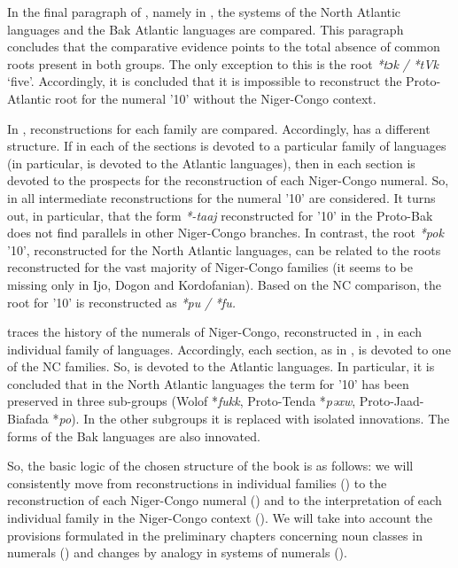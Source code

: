 In the final paragraph of , namely in , the systems of the North Atlantic languages and the Bak Atlantic languages are compared. This paragraph concludes that the comparative evidence points to the total absence of common roots present in both groups. The only exception to this is the root \textit{*tɔk} \textit{/} \textit{*tVk} ‘five'. Accordingly, it is concluded that it is impossible to reconstruct the Proto-Atlantic root for the numeral '10' without the Niger-Congo context.

In , reconstructions for each family are compared. Accordingly,  has a different structure. If in  each of the sections is devoted to a particular family of languages (in particular,  is devoted to the Atlantic languages), then in  each section is devoted to the prospects for the reconstruction of each Niger-Congo numeral. So, in  all intermediate reconstructions for the numeral '10' are considered. It turns out, in particular, that the form \textit{*-taaj} reconstructed for '10' in the Proto-Bak does not find parallels in other Niger-Congo branches. In contrast, the root \textit{*pok} '10', reconstructed for the North Atlantic languages, can be related to the roots reconstructed for the vast majority of Niger-Congo families (it seems to be missing only in Ijo, Dogon and Kordofanian). Based on the NC comparison, the root for '10' is reconstructed as \textit{*pu} \textit{/} \textit{*fu.}

 traces the history of the numerals of Niger-Congo, reconstructed in , in each individual family of languages. Accordingly, each section, as in , is devoted to one of the NC families. So,  is devoted to the Atlantic languages. In particular, it is concluded that in the North Atlantic languages the term for '10' has been preserved in three sub-groups (Wolof *\textit{fukk}, Proto-Tenda *\textit{pəxw}, Proto-Jaad-Biafada *\textit{po}). In the other subgroups it is replaced with isolated innovations. The forms of the Bak languages are also innovated.

So, the basic logic of the chosen structure of the book is as follows: we will consistently move from reconstructions in individual families () to the reconstruction of each Niger-Congo numeral () and to the interpretation of each individual family in the Niger-Congo context (). We will take into account the provisions formulated in the preliminary chapters concerning noun classes in numerals () and changes by analogy in systems of numerals ().

